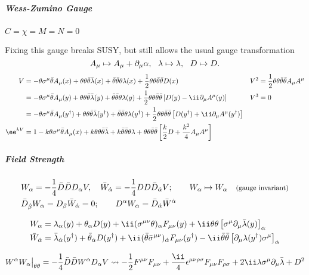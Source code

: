 \subparagraph{Wess-Zumino Gauge} $C=\chi=M=N=0$\par
Fixing this gauge breaks SUSY, but still allows the usual gauge transformation
\begin{equation}
 A_\mu \mapsto A_\mu + \partial_\mu \alpha,\ \ \lambda\mapsto\lambda,\ \ D\mapsto D.
\end{equation}
\begin{align*}
 V  &= - \theta\Sm\btheta A_\mu(x) + \thth\btheta\bar\lambda(x)
       + \bthth\theta\lambda(x) + \dfrac12\thth\bthth D(x) &
V^2 &=\dfrac12\thth\bthth A_\mu A^\mu
\\
    &= - \theta\Sm\btheta A_\mu(y) + \thth\btheta\bar\lambda(y) + \bthth\theta\lambda(y) + \dfrac12\thth\bthth \left[D(y)-\ii\Pm A^\mu(y)\right]&
V^3 &= 0
\\
    &= - \theta\Sm\btheta A_\mu(y^\dagger) + \thth\btheta\bar\lambda(y^\dagger) + \bthth\theta\lambda(y^\dagger) + \dfrac12\thth\bthth \left[D(y^\dagger)+\ii\Pm A^\mu(y^\dagger)\right]
\\
 \ee^{kV}&=1- k\theta\Sm\btheta A_\mu(x) + k\thth\btheta\bar\lambda
       + k\bthth\theta\lambda + \thth\bthth\left[\frac{k}2 D + \frac{k^2}4A_\mu A^\mu\right]
\end{align*}

\subparagraph{Field Strength}
\begin{align}
&W_\alpha       =-\frac14\bar D\bar D D_\alpha V,\quad
\bar W_{\dot\alpha} =-\frac14 D D \bar D_{\dot\alpha} V;\qquad
 W_\alpha \mapsto W_\alpha \quad\text{\footnotesize(gauge invariant)}\\
& \bar D_{\dot\beta} W_\alpha  = D_\beta \bar W_{\dot\alpha} = 0;\qquad
  D^\alpha W_\alpha =  \bar D_{\dot\alpha} \bar W^{\dot\alpha}
\end{align}
\vspace{-4.5zw}\par
\begin{align}
 W_{\alpha}
&=  \lambda_\alpha(y) + \theta_\alpha D(y) + \ii(\Smn\theta)_\alpha F_{\mu\nu}(y) +\ii \thth\left[\Sm\Pm\bar\lambda(y)\right]_\alpha\\
 \bar W_{\dalpha}
&=  \bar\lambda_\dalpha(y^\dagger) + \btheta_\dalpha D(y^\dagger) + \ii(\btheta\bSmn)_\dalpha F_{\mu\nu}(y^\dagger) -\ii \bthth\left[\Pm\lambda(y^\dagger)\Sm\right]_\dalpha
\end{align}
\vspace{-4.5zw}\par
\begin{align}
 W^\alpha W_\alpha \big|_{\thth}
=  -\frac14\bar D\bar D W^\alpha D_\alpha V
\leadsto  -\frac12F^{\mu\nu}F_{\mu\nu}+\frac\ii4\epsilon^{\mu\nu\rho\sigma}F_{\mu\nu}F_{\rho\sigma}+2\ii\lambda\Sm\Pm\bar\lambda + D^2
\end{align}

